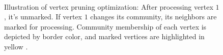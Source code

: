 \begin{figure}[hbtp]
  \centering
   \\[-2ex]
  \caption{Illustration of vertex pruning optimization: After processing vertex $1$, it's unmarked. If vertex $1$ changes its community, its neighbors are marked for processing. Community membership of each vertex is depicted by border color, and marked vertices are highlighted in yellow \cite{sahu2023gvelouvain}.}
  \label{fig:rak-pruning}
\end{figure}
